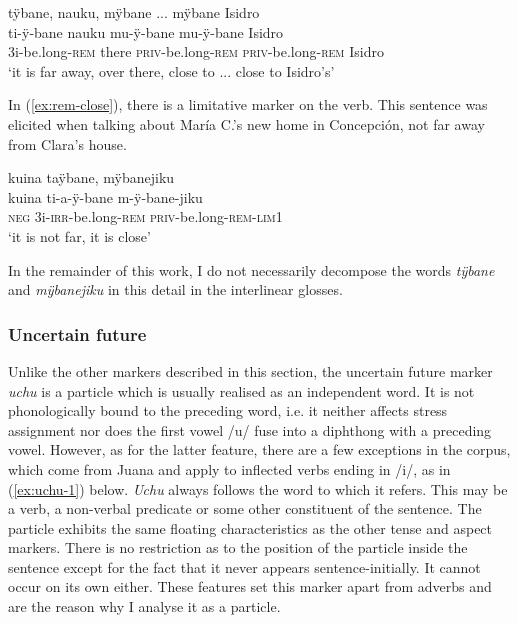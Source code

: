\ea\label{ex:far-close}
\begingl 
\glpreamble tÿbane, nauku, mÿbane ... mÿbane Isidro\\
\gla ti-ÿ-bane nauku mu-ÿ-bane mu-ÿ-bane Isidro\\ 
\glb 3i-be.long-\textsc{rem} there \textsc{priv}-be.long-\textsc{rem} \textsc{priv}-be.long-\textsc{rem} Isidro\\ 
\glft ‘it is far away, over there, close to ... close to Isidro’s’\\ 
\endgl
\trailingcitation{[rxx-e120511l.393-394]}
\xe

In (\ref{ex:rem-close}), there is a limitative marker on the verb. This sentence was elicited when talking about María C.’s new home in Concepción, not far away from Clara’s house.

\ea\label{ex:rem-close}
\begingl
\glpreamble kuina taÿbane, mÿbanejiku\\
\gla kuina ti-a-ÿ-bane m-ÿ-bane-jiku\\
\glb \textsc{neg} 3i-\textsc{irr}-be.long-\textsc{rem} \textsc{priv}-be.long-\textsc{rem}-\textsc{lim}1\\
\glft ‘it is not far, it is close’
\endgl
\trailingcitation{[cux-120410ls.065]}
\xe

In the remainder of this work, I do not necessarily decompose the words \textit{tÿbane} and \textit{mÿbanejiku} in this detail in the interlinear glosses.


\subsubsection{Uncertain future}\label{sec:UncertainFuture}

Unlike the other markers described in this section, the uncertain future marker \textit{uchu} is a particle which is usually realised as an independent word. It is not phonologically bound to the preceding word, i.e. it neither affects stress assignment nor does the first vowel /u/ fuse into a diphthong with a preceding vowel. However, as for the latter feature, there are a few exceptions in the corpus, which come from Juana and apply to inflected verbs ending in /i/, as in  (\ref{ex:uchu-1}) below. \textit{Uchu} always follows the word to which it refers. This may be a verb, a non-verbal predicate or some other constituent of the sentence. The particle exhibits the same floating characteristics as the other tense and aspect markers. There is no restriction as to the position of the particle inside the sentence except for the fact that it never appears sentence-initially. It cannot occur on its own either. These features set this marker apart from adverbs and are the reason why I analyse it as a particle.

